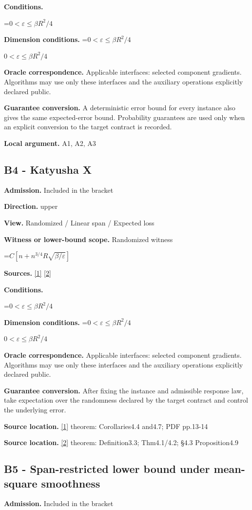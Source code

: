 \documentclass[10pt,a4paper]{article}
\newcommand{\AtlasMath}[1]{\par\begingroup\centering\setbox0=\hbox{$\displaystyle #1$}\ifdim\wd0>1.4\linewidth\typeout{ATLAS WIDE FORMULA: \the\wd0}\fi\ifdim\wd0>\linewidth\resizebox{\linewidth}{!}{\box0}\else\box0\fi\par\endgroup}
\newcommand{\AtlasInlineMath}[1]{\begingroup\setbox0=\hbox{$#1$}\ifdim\wd0>.4\linewidth\endgroup\AtlasMath{#1}\else\endgroup$#1$\fi}
\begin{document}
\textbf{Conditions.} 
\AtlasMath{0<\varepsilon\le\beta R^2/4}


\textbf{Dimension conditions.} \AtlasInlineMath{0<\varepsilon\le\beta R^2/4}

\textbf{Oracle correspondence.} Applicable interfaces: selected component gradients. Algorithms may use only these interfaces and the auxiliary operations explicitly declared public.

\textbf{Guarantee conversion.} A deterministic error bound for every instance also gives the same expected-error bound. Probability guarantees are used only when an explicit conversion to the target contract is recorded.

\textbf{Local argument.} A1, A2, A3

\subsection{B4 - Katyusha X}
\textbf{Admission.} Included in the bracket

\textbf{Direction.} upper

\textbf{View.} Randomized / Linear span / Expected loss

\textbf{Witness or lower-bound scope.} Randomized witness

\AtlasMath{C[n+n^{3/4}R\sqrt{\beta/\varepsilon}]}
\textbf{Sources.} \href{https://arxiv.org/pdf/1802.03866}{[1]} \href{https://proceedings.mlr.press/v97/zhou19b/zhou19b.pdf}{[2]}

\textbf{Conditions.} 
\AtlasMath{0<\varepsilon\le\beta R^2/4}


\textbf{Dimension conditions.} \AtlasInlineMath{0<\varepsilon\le\beta R^2/4}

\textbf{Oracle correspondence.} Applicable interfaces: selected component gradients. Algorithms may use only these interfaces and the auxiliary operations explicitly declared public.

\textbf{Guarantee conversion.} After fixing the instance and admissible response law, take expectation over the randomness declared by the target contract and control the underlying error.

\textbf{Source location.} \href{https://arxiv.org/pdf/1802.03866}{[1]} theorem: Corollaries4.4 and4.7; PDF pp.13-14

\textbf{Source location.} \href{https://proceedings.mlr.press/v97/zhou19b/zhou19b.pdf}{[2]} theorem: Definition3.3; Thm4.1/4.2; §4.3 Proposition4.9

\subsection{B5 - Span-restricted lower bound under mean-square smoothness}
\textbf{Admission.} Included in the bracket
\end{document}
